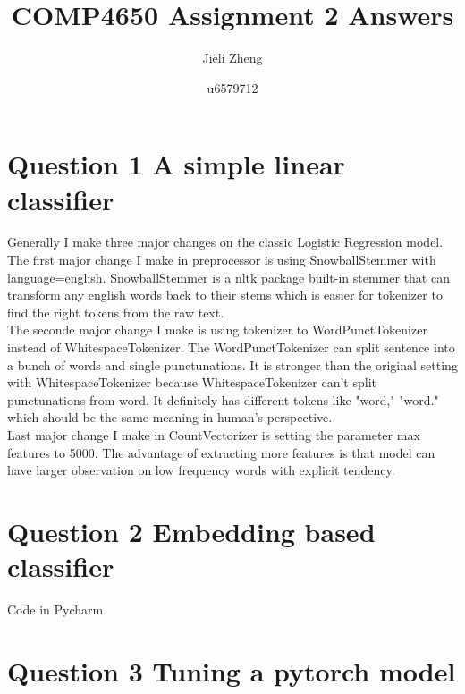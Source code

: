 \documentclass{article} %
\title{COMP4650 Assignment 2 Answers}  %
\author{Jieli Zheng}   %
\date{u6579712}
\begin{document}
\maketitle

\section*{Question 1 A simple linear classifier}
Generally I make three major changes on the classic Logistic Regression model.\\
The first major change I make in preprocessor is using SnowballStemmer with 
language=english. SnowballStemmer is a nltk package built-in stemmer that can 
transform any english words back to their stems which is easier for tokenizer 
to find the right tokens from the raw text.\\
The seconde major change I make is using tokenizer to WordPunctTokenizer instead 
of WhitespaceTokenizer. The WordPunctTokenizer can split sentence into a bunch
of words and single punctunations. It is stronger than the original setting 
with WhitespaceTokenizer because WhitespaceTokenizer can't split punctunations 
from word. It definitely has different tokens like "word," "word." which should 
be the same meaning in human's perspective.\\
Last major change I make in CountVectorizer is setting the parameter 
max features to 5000. The advantage of extracting more features is that model 
can have larger observation on low frequency words with explicit tendency. 

\section*{Question 2 Embedding based classifier}
Code in Pycharm

\section*{Question 3 Tuning a pytorch model}
\end{document}
